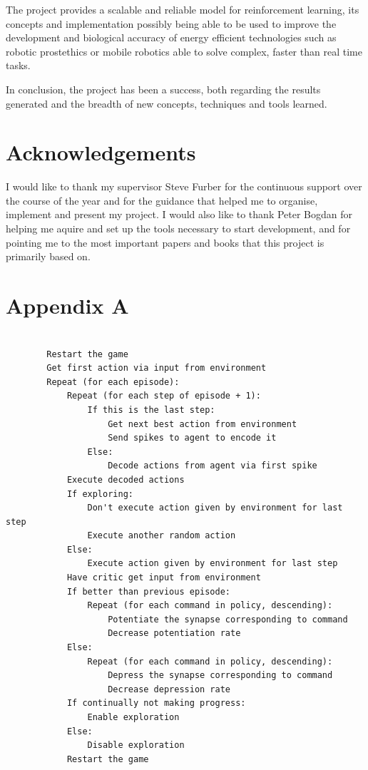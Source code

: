 \documentclass[10pt]{article}
\begin{document}
    The project provides a scalable and reliable model for reinforcement learning, its concepts and implementation possibly being able to be used to improve the development and biological accuracy of energy efficient technologies such as robotic prostethics or mobile robotics able to solve complex, faster than real time tasks.

    In conclusion, the project has been a success, both regarding the results generated and the breadth of new concepts, techniques and tools learned.

    \section*{Acknowledgements}

    I would like to thank my supervisor Steve Furber for the continuous support over the course of the year and for the guidance that helped me to organise, implement and present my project. I would also like to thank Peter Bogdan for helping me aquire and set up the tools necessary to start development, and for pointing me to the most important papers and books that this project is primarily based on.
    
    \onecolumn

    \newpage
    \section*{Appendix A}

    \begin{lstlisting}[]

        Restart the game
        Get first action via input from environment
        Repeat (for each episode):
            Repeat (for each step of episode + 1):
                If this is the last step:
                    Get next best action from environment
                    Send spikes to agent to encode it
                Else:
                    Decode actions from agent via first spike
            Execute decoded actions
            If exploring:
                Don't execute action given by environment for last step
                Execute another random action
            Else:
                Execute action given by environment for last step
            Have critic get input from environment
            If better than previous episode:
                Repeat (for each command in policy, descending):
                    Potentiate the synapse corresponding to command
                    Decrease potentiation rate
            Else:
                Repeat (for each command in policy, descending):
                    Depress the synapse corresponding to command
                    Decrease depression rate
            If continually not making progress:
                Enable exploration
            Else:
                Disable exploration
            Restart the game
    
    
    \end{lstlisting}    
        
\end{document}
